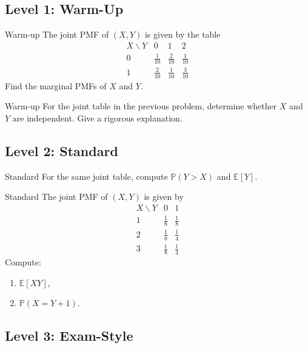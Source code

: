 \documentclass[12pt]{article}
\newcommand{\EE}{\mathbb{E}}
\newcommand{\PP}{\mathbb{P}}
\newcommand{\writespace}[1]{\vspace*{#1}}
\newcommand{\medws}{\writespace{1.8cm}}
\newcounter{problem}[section]
\begin{document}
\subsection*{Level 1: Warm-Up}

\begin{practiceproblem}{Warm-up}
The joint PMF of $(X,Y)$ is given by the table
\[
\begin{array}{c|ccc}
X\backslash Y & 0 & 1 & 2\\ \hline
0 & \tfrac{1}{10} & \tfrac{2}{10} & \tfrac{1}{10}\\
1 & \tfrac{2}{10} & \tfrac{1}{10} & \tfrac{3}{10}
\end{array}
\]
Find the marginal PMFs of $X$ and $Y$.
\end{practiceproblem}
\medws

\begin{practiceproblem}{Warm-up}
For the joint table in the previous problem, determine whether $X$ and $Y$ are independent. Give a rigorous explanation.
\end{practiceproblem}
\medws

\subsection*{Level 2: Standard}

\begin{practiceproblem}{Standard}
For the same joint table, compute $\PP(Y>X)$ and $\EE[Y]$.
\end{practiceproblem}
\medws

\begin{practiceproblem}{Standard}
The joint PMF of $(X,Y)$ is given by
\[
\begin{array}{c|cc}
X\backslash Y & 0 & 1\\ \hline
1 & \tfrac18 & \tfrac18\\
2 & \tfrac18 & \tfrac14\\
3 & \tfrac18 & \tfrac14
\end{array}
\]
Compute:
\begin{enumerate}
  \item $\EE[XY]$,
  \item $\PP(X=Y+1)$.
\end{enumerate}
\end{practiceproblem}
\medws

\subsection*{Level 3: Exam-Style}
\end{document}
